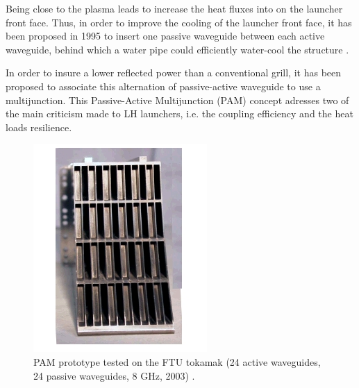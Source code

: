 Being close to the plasma leads to increase the heat fluxes into on the launcher front face. Thus, in order to improve the cooling of the launcher front face, it has been proposed in 1995 to insert one passive waveguide between each active waveguide, behind which a water pipe could efficiently water-cool the structure \parencite{Bibet1995}. 

In order to insure a lower reflected power than a conventional grill, it has been proposed to associate this alternation of passive-active waveguide to  use a multijunction. This Passive-Active Multijunction (PAM) concept adresses two of the main criticism made to LH launchers, i.e. the coupling efficiency and the heat loads resilience. 

\begin{figure}
\centering
\includegraphics[width=0.4\linewidth]{Figures/LHCD/Pam_FTU}
\caption{PAM prototype tested on the FTU tokamak (24 active waveguides, 24 passive waveguides, 8 GHz, 2003) \parencite{Mirizzi2003, Ridolfini2005}.}
\label{fig:pamftu}
\end{figure}




